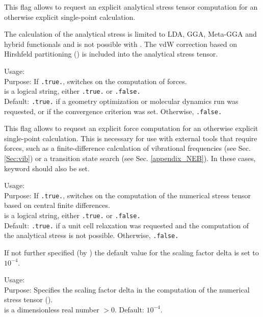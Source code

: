 This flag allows to request an explicit analytical stress tensor computation
for an otherwise explicit single-point calculation.

The calculation of the analytical stress is limited to LDA, GGA, Meta-GGA and 
hybrid functionals and is not possible with . The vdW
correction based on Hirshfeld partitioning ()
is included into the analytical stress tensor.

{
  \noindent
  Usage:   \\[1.0ex]
  Purpose: If \texttt{.true.}, switches on the computation of
    forces. \\[1.0ex] 
   is a logical string, either \texttt{.true.} or
    \texttt{.false.} \\
} 
Default: \texttt{.true.} if a geometry optimization or
molecular dynamics run was requested, or if the 
 convergence criterion was
set. Otherwise, \texttt{.false.} 

This flag allows to request an explicit force computation for an
otherwise explicit single-point calculation. This is necessary for use
with external tools that require forces, such as a finite-difference
calculation of vibrational frequencies (see
Sec. \ref{Sec:vib}) or a transition state search (see
Sec. \ref{appendix_NEB}). In these cases, keyword
 should also be set.

{
  \noindent
  Usage:   \\[1.0ex]
  Purpose: If \texttt{.true.}, switches on the computation of
  the numerical stress tensor based on central finite differences. \\[1.0ex] 
   is a logical string, either \texttt{.true.} or
    \texttt{.false.} \\
}
Default: \texttt{.true.} if a unit cell relaxation was requested and the
computation of the analytical stress is not possible. Otherwise,
\texttt{.false.}

If not further specified (by  ) the default
value for the scaling factor delta is set to $10^{-4}$.

{
  \noindent
  Usage:                          \\[1.0ex]
  Purpose: Specifies the scaling factor delta in the computation
           of the numerical stress tensor (). \\[1.0ex] 
   is a dimensionless real number $> 0$. Default: $10^{-4}$.
}


